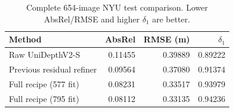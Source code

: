 \begin{table}[t]
\centering\small
\caption{Complete 654-image NYU test comparison. Lower AbsRel/RMSE and higher $\delta_1$ are better.}
\begin{tabular}{lrrr}
\toprule
Method & AbsRel & RMSE (m) & $\delta_1$\\
\midrule
Raw UniDepthV2-S & 0.11455 & 0.39889 & 0.89222\\
Previous residual refiner & 0.09564 & 0.37080 & 0.91374\\
Full recipe (577 fit) & 0.08231 & 0.33517 & 0.93979\\
Full recipe (795 fit) & 0.08112 & 0.33135 & 0.94236\\
\bottomrule
\end{tabular}
\end{table}
